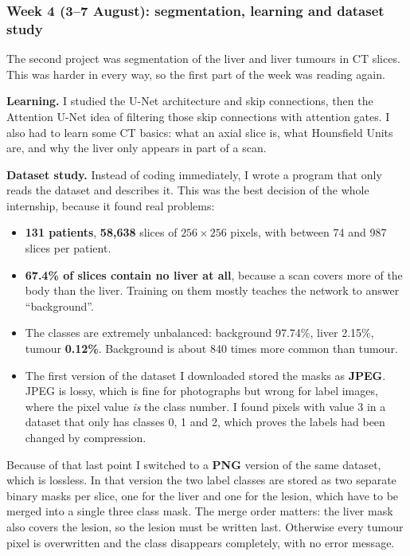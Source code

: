 \documentclass[11pt,a4paper]{article}
\begin{document}
\subsubsection*{Week 4 (3--7 August): segmentation, learning and dataset study}

The second project was segmentation of the liver and liver tumours in CT slices.
This was harder in every way, so the first part of the week was reading again.

\textbf{Learning.} I studied the U-Net architecture and skip connections, then
the Attention U-Net idea of filtering those skip connections with attention
gates. I also had to learn some CT basics: what an axial slice is, what
Hounsfield Units are, and why the liver only appears in part of a scan.

\textbf{Dataset study.} Instead of coding immediately, I wrote a program that
only reads the dataset and describes it. This was the best decision of the whole
internship, because it found real problems:

\begin{itemize}
  \item \textbf{131 patients}, \textbf{58{,}638} slices of $256\times256$ pixels,
        with between 74 and 987 slices per patient.
  \item \textbf{67.4\% of slices contain no liver at all}, because a scan covers
        more of the body than the liver. Training on them mostly teaches the
        network to answer ``background''.
  \item The classes are extremely unbalanced: background 97.74\%, liver 2.15\%,
        tumour \textbf{0.12\%}. Background is about 840 times more common than
        tumour.
  \item The first version of the dataset I downloaded stored the masks as
        \textbf{JPEG}. JPEG is lossy, which is fine for photographs but wrong for
        label images, where the pixel value \emph{is} the class number. I found
        pixels with value 3 in a dataset that only has classes 0, 1 and 2, which
        proves the labels had been changed by compression.
\end{itemize}

Because of that last point I switched to a \textbf{PNG} version of the same
dataset, which is lossless. In that version the two label classes are stored as
two separate binary masks per slice, one for the liver and one for the lesion,
which have to be merged into a single three class mask. The merge order matters:
the liver mask also covers the lesion, so the lesion must be written last.
Otherwise every tumour pixel is overwritten and the class disappears completely,
with no error message.
\end{document}
